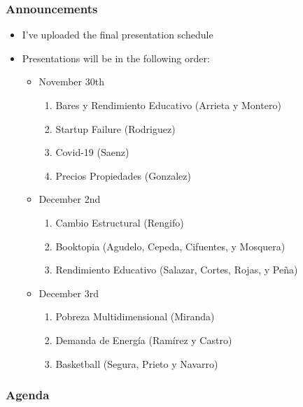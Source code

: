 \documentclass[
  shownotes,
  xcolor={svgnames},
  hyperref={colorlinks,citecolor=DarkBlue,linkcolor=DarkRed,urlcolor=DarkBlue}
  , aspectratio=169]{beamer}
\begin{document}
\begin{frame}
\frametitle{Announcements}

\begin{itemize}

  \item I've uploaded the final presentation schedule
    \medskip
  \item Presentations will be in the following order:

  \begin{itemize}
    \item November 30th
    \begin{enumerate}
        \item Bares y Rendimiento Educativo (Arrieta y Montero)
        \item Startup Failure (Rodriguez)
        \item Covid-19 (Saenz)
        \item Precios Propiedades (Gonzalez)
      \end{enumerate}
      \item December 2nd
      \begin{enumerate}
        \item Cambio Estructural (Rengifo)
        \item Booktopia (Agudelo, Cepeda, Cifuentes, y Mosquera)
        \item Rendimiento Educativo (Salazar, Cortes, Rojas, y Peña)
        \end{enumerate}
        \item December 3rd
        \begin{enumerate}
          \item Pobreza Multidimensional (Miranda)
          \item Demanda de Energía (Ramírez y Castro)
          \item Basketball (Segura, Prieto y Navarro)
        \end{enumerate}
  \end{itemize}
    \end{itemize}

\end{frame}

\begin{frame}
\frametitle{Agenda}

\tableofcontents

\end{frame}
\end{document}
